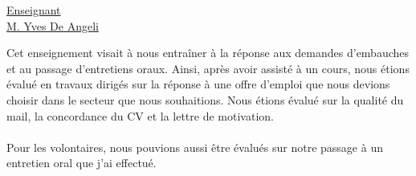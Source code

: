 \renewcommand{\figurename}{}

\vspace*{0.2cm}%
      \large
      \href{}{\color{black}Enseignant\\M. Yves De Angeli}\\%
      \normalsize
\vspace*{0.5cm}%


Cet enseignement visait à nous entraîner à la réponse aux demandes d'embauches et au passage d'entretiens oraux. Ainsi, après avoir assisté à un cours, nous étions évalué en travaux dirigés sur la réponse à une offre d'emploi que nous devions choisir dans le secteur que nous souhaitions. Nous étions évalué sur la qualité du mail, la concordance du CV et la lettre de motivation.
\\ \\
Pour les volontaires, nous pouvions aussi être évalués sur notre passage à un entretien oral que j'ai effectué.